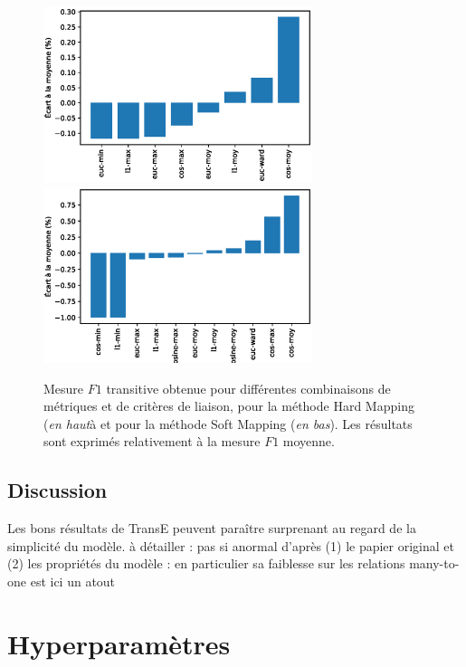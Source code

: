\begin{figure}
    \centering
    \includegraphics[width=0.7\textwidth]{fig/plot/taxex_cluster-params_HM.eps}
    \includegraphics[width=0.7\textwidth]{fig/plot/taxex_cluster-params_SM.eps}
    \caption[Influence des paramètres de regroupement sur l'extraction de taxonomie]{Mesure $F1$ transitive obtenue pour différentes combinaisons de métriques et de critères de liaison, pour la méthode Hard Mapping (\textit{en haut}à et pour la méthode Soft Mapping (\textit{en bas}). Les résultats sont exprimés relativement à la mesure $F1$ moyenne.}
    \label{fig:taxex-cluparams-HM}
\end{figure}


\subsection{Discussion}
\label{subsec:te-discussion}

Les bons résultats de TransE peuvent paraître surprenant au regard de la simplicité du modèle. à détailler : pas si anormal d'après (1) le papier original et (2) les propriétés du modèle : en particulier sa faiblesse sur les relations many-to-one est ici un atout


\section{Hyperparamètres}
\label{sec:te-hp}

